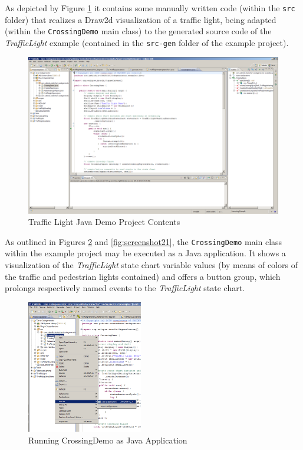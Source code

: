 \clearpage
As depicted by Figure \ref{fig:screenshot19} it contains some manually written
code (within the \texttt{src} folder) that realizes a Draw2d visualization of
a traffic light, being adapted (within the \texttt{CrossingDemo} main class)
to the generated source code of the \emph{TrafficLight} example (contained in
the \texttt{src-gen} folder of the example project).

\begin{figure}[h!]
\center
\includegraphics[width=\textwidth]{./Pictures/Screenshot19}
\caption{\label{fig:screenshot19} Traffic Light Java Demo Project Contents}
\end{figure}

\clearpage
As outlined in Figures \ref{fig:screenshot20} and \ref{fig:screenshot21}, the
\texttt{CrossingDemo} main class within the example project may be executed as
a Java application. It shows a visualization of the \emph{TrafficLight} state
chart variable values (by means of colors of the traffic and pedestrian lights
contained) and offers a button group, which prolongs respectively named events
to the \emph{TrafficLight} state chart.

\begin{figure}[h!]
\center
\includegraphics[width=0.45\textwidth]{./Pictures/Screenshot20}
\caption{\label{fig:screenshot20} Running CrossingDemo as Java Application}
\end{figure}

